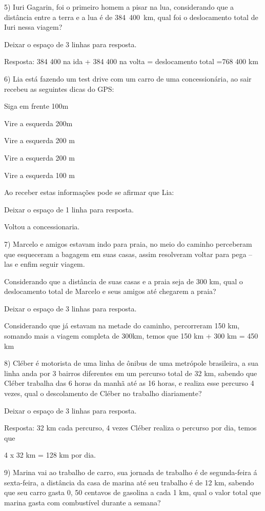 5) Iuri Gagarin, foi o primeiro homem a pisar na lua, considerando que a
distância entre a terra e a lua é de 384~400~km, qual foi o deslocamento
total de Iuri nessa viagem?

Deixar o espaço de 3 linhas para resposta.

Resposta: 384 400 na ida + 384 400 na volta = deslocamento total =768
400 km

6) Lia está fazendo um test drive com um carro de uma concessionária, ao
sair recebeu as seguintes dicas do GPS:

Siga em frente 100m

Vire a esquerda 200m

Vire a esquerda 200 m

Vire a esquerda 200 m

Vire a esquerda 100 m

Ao receber estas informações pode se afirmar que Lia:

Deixar o espaço de 1 linha para resposta.

Voltou a concessionaria.

7) Marcelo e amigos estavam indo para praia, no meio do caminho
perceberam que esqueceram a bagagem em suas casas, assim resolveram
voltar para pega -- las e enfim seguir viagem.

Considerando que a distância de suas casas e a praia seja de 300 km,
qual o deslocamento total de Marcelo e seus amigos até chegarem a praia?

Deixar o espaço de 3 linhas para resposta.

Considerando que já estavam na metade do caminho, percorreram 150 km,
somando mais a viagem completa de 300km, temos que 150 km + 300 km = 450
km

8) Cléber é motorista de uma linha de ônibus de uma metrópole
brasileira, a sua linha anda por 3 bairros diferentes em um percurso
total de 32 km, sabendo que Cléber trabalha das 6 horas da manhã até as
16 horas, e realiza esse percurso 4 vezes, qual o descolamento de Cléber
no trabalho diariamente?

Deixar o espaço de 3 linhas para resposta.

Resposta: 32 km cada percurso, 4 vezes Cléber realiza o percurso por
dia, temos que

4 x 32 km = 128 km por dia.

9) Marina vai ao trabalho de carro, sua jornada de trabalho é de
segunda-feira á sexta-feira, a distância da casa de marina até seu
trabalho é de 12 km, sabendo que seu carro gasta 0, 50 centavos de
gasolina a cada 1 km, qual o valor total que marina gasta com
combustível durante a semana?

